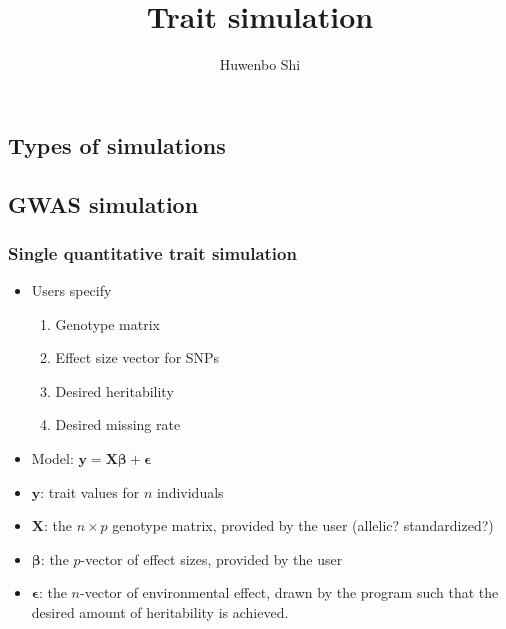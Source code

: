 \documentclass[12pt]{article}
\newcommand{\by}{\boldsymbol{y}}
\newcommand{\bX}{\boldsymbol{X}}
\newcommand{\bbeta}{\boldsymbol{\beta}}
\newcommand{\bepsilon}{\boldsymbol{\epsilon}}
\begin{document}
\title{Trait simulation}
\author{Huwenbo Shi}
\maketitle

\begin{spacing}{1.0}

\section{Types of simulations}

\subsection{GWAS simulation }

\subsubsection{Single quantitative trait simulation}
\begin{itemize}
    \item Users specify
        \begin{enumerate}
            \item Genotype matrix
            \item Effect size vector for SNPs
            \item Desired heritability
            \item Desired missing rate
        \end{enumerate}
    \item Model: $\by = \bX \bbeta + \bepsilon$
    \item $\by$: trait values for $n$ individuals
    \item $\bX$: the $n \times p$ genotype matrix, provided by the user (allelic? standardized?)
    \item $\bbeta$: the $p$-vector of effect sizes, provided by the user
    \item $\bepsilon$: the $n$-vector of environmental effect, drawn by the program such
          that the desired amount of heritability is achieved.
\end{itemize}


\end{spacing}
\end{document}
